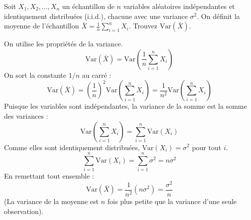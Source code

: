 \begin{exercicebox}
Soit $X_1, X_2, \dots, X_n$ un échantillon de $n$ variables aléatoires indépendantes et identiquement distribuées (i.i.d.), chacune avec une variance $\sigma^2$. On définit la moyenne de l'échantillon $\bar{X} = \frac{1}{n} \sum_{i=1}^n X_i$.
Trouvez $\text{Var}(\bar{X})$.
\end{exercicebox}

\begin{correctionbox}
On utilise les propriétés de la variance.
$$\text{Var}(\bar{X}) = \text{Var}\left(\frac{1}{n} \sum_{i=1}^n X_i\right)$$
On sort la constante $1/n$ au carré :
$$\text{Var}(\bar{X}) = \left(\frac{1}{n}\right)^2 \text{Var}\left(\sum_{i=1}^n X_i\right) = \frac{1}{n^2} \text{Var}\left(\sum_{i=1}^n X_i\right)$$
Puisque les variables sont indépendantes, la variance de la somme est la somme des variances :
$$\text{Var}\left(\sum_{i=1}^n X_i\right) = \sum_{i=1}^n \text{Var}(X_i)$$
Comme elles sont identiquement distribuées, $\text{Var}(X_i) = \sigma^2$ pour tout $i$.
$$\sum_{i=1}^n \text{Var}(X_i) = \sum_{i=1}^n \sigma^2 = n\sigma^2$$
En remettant tout ensemble :
$$\text{Var}(\bar{X}) = \frac{1}{n^2} (n\sigma^2) = \frac{\sigma^2}{n}$$
(La variance de la moyenne est $n$ fois plus petite que la variance d'une seule observation).
\end{correctionbox}